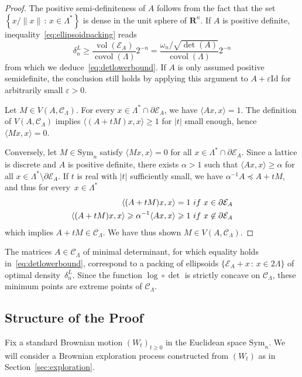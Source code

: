 \documentclass[10pt,a4paper]{amsart}
\newcommand{\R}{\mathbf{R}}
\newcommand{\e}{\varepsilon}
\newcommand{\Id}{\mathrm{Id}}
\newcommand{\Sym}{\mathrm{Sym}}
\DeclareMathOperator{\vol}{vol}
\DeclareMathOperator{\covol}{covol}
\newcommand{\scalar}[2]{\langle #1 , #2\rangle}
\renewcommand{\geq}{\geqslant}
\begin{document}
\begin{proof}
The positive semi-definiteness of $A$ follows from the fact that the set $\left\{ x/\|x\| \, : \, x \in \Lambda^* \right\}$ is dense in the unit sphere of $\R^n$. If $A$ is positive definite, inequality~\eqref{eq:ellipsoidpacking} reads
\[ \delta_n^L \geq \frac{\vol (\mathcal{E}_A)}{\covol (\Lambda)} 2^{-n} = \frac{\omega_n / \sqrt{\det(A)}}{\covol (\Lambda)} 2^{-n} \]
from which we deduce~\eqref{eq:detlowerbound}. If $A$ is only assumed positive semidefinite, the conclusion still holds by applying this argument to $A + \e \Id$ for arbitrarily small $\e>0$.
 
Let $M \in V(A,\mathscr{C}_\Lambda)$. For every $x \in \Lambda^* \cap \partial\mathcal{E}_A$, we have $\scalar{Ax}{x}=1$. The definition of $V(A,\mathscr{C}_\Lambda)$ implies $\scalar{(A+tM)x}{x} \geq 1$ for $|t|$ small enough, hence $\scalar{Mx}{x}=0$.
 
Conversely, let $M \in \Sym_n$ satisfy $\scalar{Mx}{x} = 0$ for all $x \in \Lambda^* \cap \partial\mathcal{E}_A$. Since a lattice is discrete and $A$ is positive definite, there exists $\alpha >1$ such that $\scalar{Ax}{x} \geq \alpha$ for all $x \in \Lambda^* \setminus \partial\mathcal{E}_A$. If $t$ is real with $|t|$ sufficiently small, we have $\alpha^{-1} A  \preccurlyeq A + t M$, and thus for every~$x \in \Lambda^*$
\begin{align*}
\scalar{(A+tM)x}{x}  = 1 & \ \textnormal{ if }\  x \in \partial\mathcal{E}_A  \\
\scalar{(A+tM)x}{x}  \geq \alpha^{-1} \scalar{Ax}{x} \geq 1 & \ \textnormal{ if } \ x \not \in \partial\mathcal{E}_A
\end{align*}
which implies $A+tM \in \mathscr{C}_\Lambda$. We have thus shown $M \in V(A,\mathscr{C}_\Lambda)$.
\end{proof}
 
The matrices $A \in \mathscr{C}_\Lambda$ of minimal determinant, for which equality holds in~\eqref{eq:detlowerbound}, correspond to a packing of ellipsoids $\{\mathcal{E}_A + x \, : \, x \in 2\Lambda\}$ of optimal density~$\delta_n^L$. Since the function $\log \circ \det$ is strictly concave on $\mathscr{C}_\Lambda$, these minimum points are extreme points of $\mathscr{C}_\Lambda$.
 
\subsection{Structure of the Proof}
 
Fix a standard Brownian motion $(W_t)_{t \geq 0}$ in the Euclidean space $\Sym_n$.
We will consider a Brownian exploration process constructed from $(W_t)$ as in Section~\ref{sec:exploration}.
 
\end{document}
